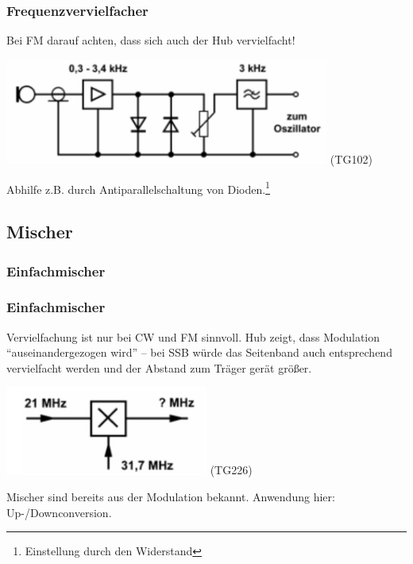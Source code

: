 \begin{frame}
    \frametitle{Frequenzvervielfacher}

    Bei FM darauf achten, dass sich auch der Hub vervielfacht!

    \begin{center}
        \includegraphics[width=0.8\textwidth,height=.5\textheight,keepaspectratio]{a13/TG102.png}
	{\tiny (TG102)}
    \end{center}

    Abhilfe z.B. durch Antiparallelschaltung von Dioden.\footnote{Einstellung durch
    den Widerstand}

\end{frame}

\subsection{Mischer}

\subsubsection{Einfachmischer}

\begin{frame}
    \frametitle{Einfachmischer}

    Vervielfachung ist nur bei CW und FM sinnvoll. Hub zeigt, dass Modulation ``auseinandergezogen wird'' -- bei SSB würde das Seitenband auch entsprechend vervielfacht werden und der Abstand zum Träger gerät größer.

    \begin{center}
        \includegraphics[width=0.5\textwidth,height=.5\textheight,keepaspectratio]{a13/TG226.png}
	{\tiny (TG226)}
    \end{center}

    Mischer sind bereits aus der Modulation bekannt. Anwendung hier:
    Up-/Downconversion.
\end{frame}

